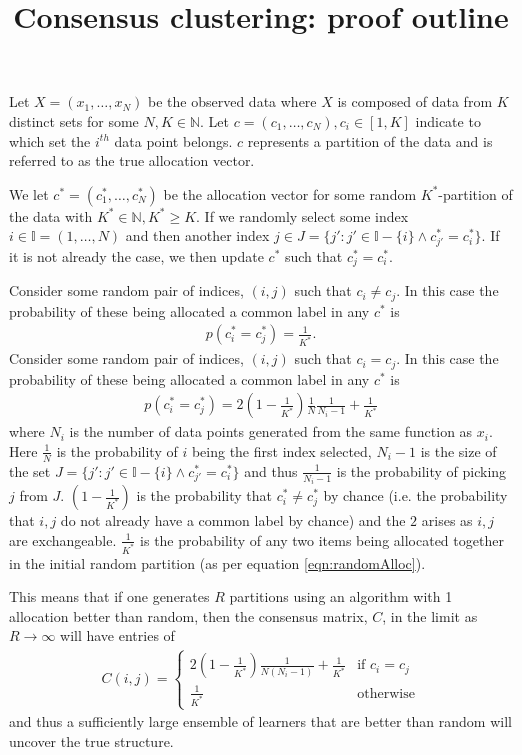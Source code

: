 \documentclass[]{article}
\title{Consensus clustering: proof outline}
\begin{document}
\maketitle

Let $X=(x_1, \ldots, x_N)$ be the observed data where $X$ is composed of data from $K$ distinct sets for some $N, K \in \mathbb{N}$. Let $c=(c_1, \ldots, c_N), c_i \in [1, K]$ indicate to which set the $i^{th}$ data point belongs. $c$ represents a partition of the data and is referred to as the true allocation vector.

We let $c^* = (c_1^*, \ldots,c_N^*)$ be the allocation vector for some random $K^*$-partition of the data with $K^* \in \mathbb{N}, K^* \geq K$. If we randomly select some index $i \in \mathbb{I}=(1, \ldots, N)$ and then another index $j \in J=\{j' : j' \in \mathbb{I} - \{i\} \wedge c_{j'}^*=c_i^*\}$. If it is not already the case, we then update $c^*$ such that $c_j^* = c_i^*$. 

Consider some random pair of indices, $(i,j)$ such that $c_i \neq c_j$. In this case the probability of these being allocated a common label in any $c^*$ is
\begin{align}
	p(c_i^* = c_j^*) = \frac{1}{K^*}.
	\label{eqn:randomAlloc}
\end{align}
Consider some random pair of indices, $(i,j)$ such that $c_i=c_j$. In this case the probability of these being allocated a common label in any $c^*$ is
\begin{align}
	p(c_i^* = c_j^*) = 2 \left(1 - \frac{1}{K^*}\right) \frac{1}{N}\frac{1}{N_i - 1} + \frac{1}{K^*}
\end{align}
where $N_i$ is the number of data points generated from the same function as $x_i$. Here $\frac{1}{N}$ is the probability of $i$ being the first index selected, $N_i - 1$ is the size of the set $J=\{j' : j' \in \mathbb{I} - \{i\} \wedge c_{j'}^*=c_i^*\}$ and thus $\frac{1}{N_i - 1}$ is the probability of picking $j$ from $J$. $(1 - \frac{1}{K^*})$ is the probability that $c_i^* \neq c_j^*$ by chance (i.e. the probability that $i,j$ do not already have a common label by chance) and the $2$ arises as $i,j$ are exchangeable. $\frac{1}{K^*}$ is the probability of any two items being allocated together in the initial random partition (as per equation \ref{eqn:randomAlloc}).

This means that if one generates $R$ partitions using an algorithm with 1 allocation better than random, then the consensus matrix, $C$, in the limit as $R \to \infty$ will have entries of 
\begin{align}
	C(i, j) = \begin{cases}
		2 (1 - \frac{1}{K^*}) \frac{1}{N(N_i - 1)} + \frac{1}{K^*} & \text{if $c_i = c_j$}\\
		\frac{1}{K^*} & \text{otherwise}
	\end{cases}       
\end{align}
and thus a sufficiently large ensemble of learners that are better than random will uncover the true structure.
\end{document}
